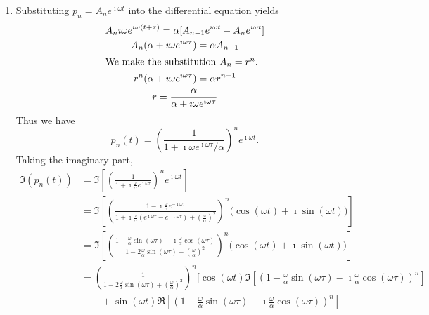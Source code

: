 \begin{Solution}
  \begin{enumerate}
  \item
    Substituting $p_n = A_n e^{\imath \omega t}$ into the differential equation
    yields
    \begin{gather*}
      A_n \imath \omega e^{\imath \omega(t+\tau)} = \alpha[ A_{n-1} e^{\imath \omega t} - 
      A_n e^{\imath \omega t} ] \\
      A_n (\alpha + \imath \omega e^{\imath \omega \tau}) = \alpha A_{n-1} \\
      \intertext{We make the substitution $A_n = r^n$.}
      r^n (\alpha + \imath \omega e^{\imath \omega \tau}) = \alpha r^{n-1} \\
      r = \frac{\alpha}{\alpha + \imath \omega e^{\imath \omega \tau}}
    \end{gather*}
    Thus we have
    \[ \boxed{p_n(t)=\left(\frac{1}{1+\imath \omega e^{\imath \omega \tau} / \alpha}\right)^n
      e^{\imath \omega t}. } \]
    Taking the imaginary part,
    \begin{align*}
      \Im(p_n(t))
      &= \Im\left[ \left(\frac{1}{1+\imath \frac{\omega }{\alpha}
            e^{\imath \omega \tau}}\right)^n e^{\imath \omega t} \right] \\
      &= \Im\left[ \left( 
          \frac{1-\imath \frac{\omega}{\alpha} e^{-\imath \omega \tau}}
          {1 + \imath \frac{\omega}{\alpha}(e^{\imath \omega \tau}
            - e^{-\imath \omega \tau}) + (\frac{\omega}{\alpha})^2} \right)^n
        \big( \cos(\omega t) + \imath \sin(\omega t) \big) \right] \\
      &= \Im\left[ \left( 
          \frac{1 - \frac{\omega}{\alpha} \sin(\omega \tau)
            - \imath \frac{\omega}{\alpha} \cos(\omega \tau) }
          {1 - 2 \frac{\omega}{\alpha} \sin(\omega \tau) 
            +(\frac{\omega}{\alpha})^2} \right)^n
        \big( \cos(\omega t) + \imath \sin(\omega t) \big) \right] \\
      &= \left(\frac{1}{1 - 2 \frac{\omega}{\alpha} \sin(\omega \tau)
          +(\frac{\omega}{\alpha})^2} \right)^n
      \Big[ \cos(\omega t) \Im\left[\left(1 
          - \frac{\omega}{\alpha} \sin(\omega \tau)
          - \imath \frac{\omega}{\alpha} \cos(\omega \tau)\right)^n \right] \\
      &\qquad + \sin(\omega t) \Re\left[ \left(1 
          - \frac{\omega}{\alpha} \sin(\omega \tau)
          - \imath \frac{\omega}{\alpha} \cos(\omega \tau)\right)^n \right] 

\end{align*}
\end{enumerate}
\end{Solution}
